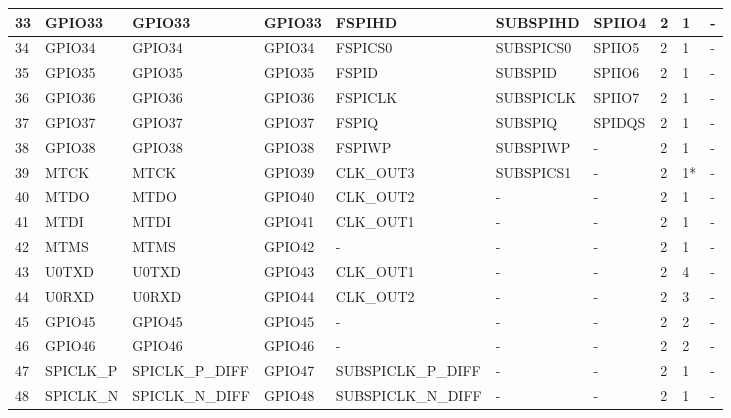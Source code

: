 \begin{longtable}[c]{|p{0.7cm}|p{1.9cm}|p{1.9cm}|p{1.7cm}|p{1.7cm}|p{1.8cm}|p{1.7cm}|p{0.5cm}<{\centering}|p{0.5cm}<{\centering}|p{0.7cm}<{\centering}| }
33 & GPIO33          &  GPIO33       & GPIO33  & FSPIHD     & SUBSPIHD     & SPIIO4      & 2 & 1 & -    \\ \hline
34 & GPIO34          &  GPIO34       & GPIO34  & FSPICS0    & SUBSPICS0    & SPIIO5      & 2 & 1 & -    \\ \hline
35 & GPIO35          &  GPIO35       & GPIO35  & FSPID      & SUBSPID      & SPIIO6      & 2 & 1 & -    \\ \hline
36 & GPIO36          &  GPIO36       & GPIO36  & FSPICLK    & SUBSPICLK    & SPIIO7      & 2 & 1 & -    \\ \hline
37 & GPIO37          &  GPIO37       & GPIO37  & FSPIQ      & SUBSPIQ      & SPIDQS      & 2 & 1 & -    \\ \hline
38 & GPIO38          &  GPIO38       & GPIO38  & FSPIWP     & SUBSPIWP     & -           & 2 & 1 & -    \\ \hline
39 & MTCK            &  MTCK         & GPIO39  & CLK\_OUT3  & SUBSPICS1    & -           & 2 & 1* & -    \\ \hline
40 & MTDO            &  MTDO         & GPIO40  & CLK\_OUT2  & -            & -           & 2 & 1 & -    \\ \hline
41 & MTDI            &  MTDI         & GPIO41  & CLK\_OUT1  & -            & -           & 2 & 1 & -    \\ \hline
42 & MTMS            &  MTMS         & GPIO42  & -          & -            & -           & 2 & 1 & -    \\ \hline
43 & U0TXD           &  U0TXD        & GPIO43  & CLK\_OUT1  & -            & -           & 2 & 4 & -    \\ \hline
44 & U0RXD           &  U0RXD        & GPIO44  & CLK\_OUT2  & -            & -           & 2 & 3 & -    \\ \hline
45 & GPIO45          &  GPIO45       & GPIO45  & -          & -            & -           & 2 & 2 & -    \\ \hline
46 & GPIO46          &  GPIO46       & GPIO46  & -          & -            & -           & 2 & 2 & -    \\ \hline

47 & SPICLK\_P & \tiny{SPICLK\_P\_DIFF} & GPIO47 & \tiny{SUBSPICLK\_P\_DIFF} & - & - & 2 & 1 & - \\ \hline
48 & SPICLK\_N & \tiny{SPICLK\_N\_DIFF} & GPIO48 & \tiny{SUBSPICLK\_N\_DIFF} & - & - & 2 & 1 & - \\ \hline

    \end{longtable}
\normalsize
